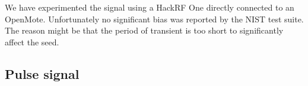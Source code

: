 We have experimented the signal using a HackRF One\cite{HackRFOne} directly connected to an OpenMote\cite{OpenMote}. Unfortunately no significant bias was reported by the NIST test suite. The reason might be that the period of transient is too short to significantly affect the seed.

\subsection{Pulse signal} \label{Pulse}

